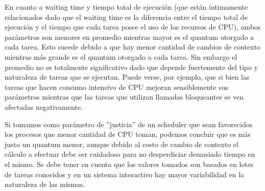 En cuanto a waiting time y tiempo total de ejecución (que están íntimamente relacionados dado que el waiting time es la diferencia entre el tiempo total de ejecución y el tiempo que cada tarea posee el uso de los recursos de CPU), ambos parámetros son menores en promedio mientras mayor es el quantum otorgado a cada tarea. Esto sucede debido a que hay menor cantidad de cambios de contexto mientras más grande es el quantum otorgado a cada tarea. 
Sin embargo el promedio no es totalmente significativo dado que depende fuertemente del tipo y naturaleza de tareas que se ejecutan. Puede verse, por ejemplo, que si bien las tareas que hacen consumo intensivo de CPU mejoran sensiblemente sus parámetros mientras que las tareas que utilizan llamadas bloqueantes se ven afectadas negativamente.

Si tomamos como parámetro de ''justicia'' de un scheduler que sean favorecidos los procesos que menor cantidad de CPU toman, podemos concluir que es más justo un quantum menor, aunque debido al costo de cambio de contexto el cálculo a efectuar debe ser cuidadoso para no desperdiciar demasiado tiempo en el mismo. Se debe tener en cuenta que los valores tomados son basados en lotes de tareas conocidos y en un sistema interactivo hay mayor variabilidad en la naturaleza de las mismas.

\clearpage   %
